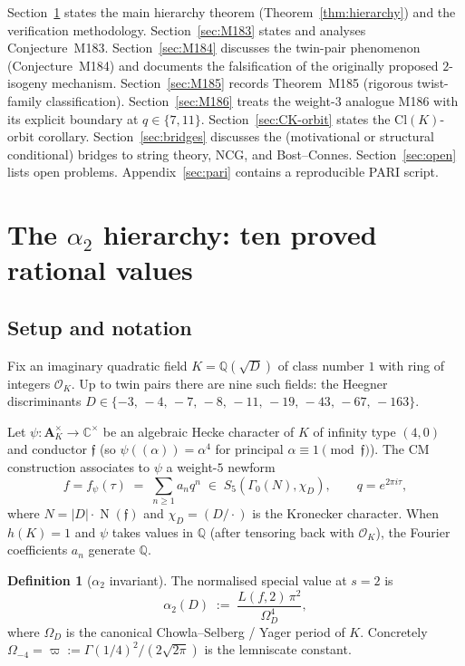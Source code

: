 \documentclass[12pt]{amsart}
\theoremstyle{definition}
\newtheorem{definition}[theorem]{Definition}
\DeclareMathOperator{\Nm}{N}
\newcommand{\Q}{\mathbb{Q}}
\newcommand{\C}{\mathbb{C}}
\newcommand{\OK}{\mathcal{O}_K}
\newcommand{\ff}{\mathfrak{f}}
\begin{document}
Section~\ref{sec:hierarchy} states the main hierarchy theorem
(Theorem~\ref{thm:hierarchy}) and the verification methodology.
Section~\ref{sec:M183} states and analyses Conjecture~M183.
Section~\ref{sec:M184} discusses the twin-pair phenomenon
(Conjecture~M184) and documents the falsification of the originally
proposed $2$-isogeny mechanism.
Section~\ref{sec:M185} records Theorem~M185 (rigorous twist-family
classification).
Section~\ref{sec:M186} treats the weight-$3$ analogue M186 with its
explicit boundary at $q \in \{7,11\}$.
Section~\ref{sec:CK-orbit} states the Cl$(K)$-orbit corollary.
Section~\ref{sec:bridges} discusses the (motivational or structural
conditional) bridges to string theory, NCG, and Bost--Connes.
Section~\ref{sec:open} lists open problems.
Appendix~\ref{sec:pari} contains a reproducible PARI script.

\section{The $\alpha_2$ hierarchy: ten proved rational values}
\label{sec:hierarchy}

\subsection{Setup and notation}
\label{ssec:setup}

Fix an imaginary quadratic field $K = \Q(\sqrt{D})$ of class number $1$
with ring of integers $\OK$. Up to twin pairs there are nine such fields:
the Heegner discriminants
$D \in \{-3,\,-4,\,-7,\,-8,\,-11,\,-19,\,-43,\,-67,\,-163\}$.

Let $\psi : \mathbf{A}_K^\times \to \C^\times$ be an algebraic Hecke
character of $K$ of infinity type $(4,0)$ and conductor $\ff$
(so $\psi((\alpha)) = \alpha^4$ for principal $\alpha \equiv 1
\pmod{\ff}$). The CM construction associates to $\psi$ a weight-$5$
newform
\[
  f = f_\psi(\tau) \;=\; \sum_{n \ge 1} a_n q^n
   \;\in\; S_5(\Gamma_0(N), \chi_D),\qquad q = e^{2\pi i \tau},
\]
where $N = |D| \cdot \Nm(\ff)$ and $\chi_D = (D/\cdot)$ is the
Kronecker character. When $h(K) = 1$ and $\psi$ takes values in $\Q$ (after
tensoring back with $\OK$), the Fourier coefficients $a_n$ generate $\Q$.

\begin{definition}[$\alpha_2$ invariant]\label{def:alpha2}
The normalised special value at $s=2$ is
\begin{equation}\label{eq:alpha2def}
  \alpha_2(D) \;:=\; \frac{L(f, 2)\,\pi^2}{\Omega_D^4},
\end{equation}
where $\Omega_D$ is the canonical Chowla--Selberg / Yager period of $K$.
Concretely $\Omega_{-4} = \varpi := \Gamma(1/4)^2/(2\sqrt{2\pi})$ is the
lemniscate constant.
\end{definition}
\end{document}
